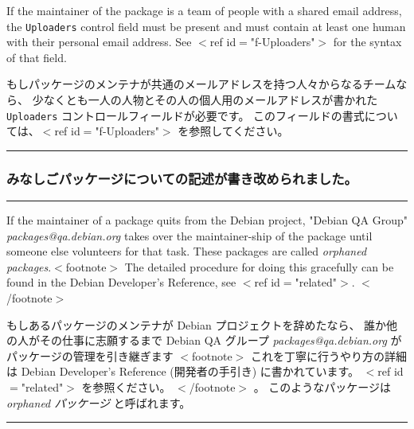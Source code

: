 \documentclass[mingoth,a4paper]{jsarticle}
\begin{document}
\par
\parbox[t]{0.48\linewidth}{
	  If the maintainer of the package is a team of people with a
	  shared email address, the {\tt Uploaders} control field must
	  be present and must contain at least one human with their
	  personal email address.  See $<$ref id$=$"f-Uploaders"$>$ for the
	  syntax of that field.
}\hfil
\parbox[t]{0.48\linewidth}{
	    もしパッケージのメンテナが共通のメールアドレスを持つ人々からなるチームなら、
	    少なくとも一人の人物とその人の個人用のメールアドレスが書かれた
	    {\tt Uploaders} コントロールフィールドが必要です。
	    このフィールドの書式については、$<$ref id$=$"f-Uploaders"$>$ を参照してください。
}
\hrule
\vspace{1ex}


\subsubsection{みなしごパッケージについての記述が書き改められました。}

\vspace*{1ex}
\hrule
{}\par
\parbox[t]{0.48\linewidth}{
	  If the maintainer of a package quits from the Debian
	  project, "Debian QA Group"
	  {\it packages@qa.debian.org} takes over the
	  maintainer-ship of the package until someone else
	  volunteers for that task. These packages are called
	  {\em orphaned packages}.$<$footnote$>$
		The detailed procedure for doing this gracefully can
		be found in the Debian Developer's Reference,
		see $<$ref id$=$"related"$>$.
	  $<$/footnote$>$
}\hfil
\parbox[t]{0.48\linewidth}{
	    もしあるパッケージのメンテナが Debian プロジェクトを辞めたなら、
	    誰か他の人がその仕事に志願するまで Debian QA グループ
	    {\it packages@qa.debian.org}
	    がパッケージの管理を引き継ぎます
	    $<$footnote$>$
		これを丁寧に行うやり方の詳細は Debian Developer's
		Reference (開発者の手引き) に書かれています。
		$<$ref id$=$"related"$>$ を参照ください。
	    $<$/footnote$>$ 。
	    このようなパッケージは {\em orphaned パッケージ}
	    と呼ばれます。
}
\hrule
\end{document}
